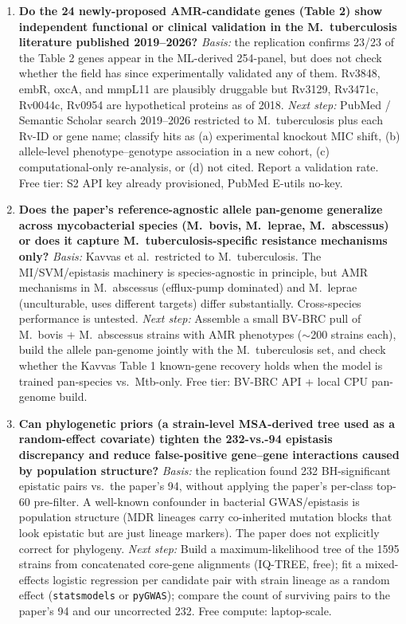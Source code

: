 \begin{enumerate}[leftmargin=1.6em,itemsep=0.6em]
\item \textbf{Do the 24 newly-proposed AMR-candidate genes (Table 2) show independent
functional or clinical validation in the M.\ tuberculosis literature published 2019--2026?}
\emph{Basis:} the replication confirms 23/23 of the Table 2 genes appear in the ML-derived
254-panel, but does not check whether the field has since experimentally validated any of
them. Rv3848, embR, oxcA, and mmpL11 are plausibly druggable but Rv3129, Rv3471c, Rv0044c,
Rv0954 are hypothetical proteins as of 2018.
\emph{Next step:} PubMed / Semantic Scholar search 2019--2026 restricted to M.\ tuberculosis
plus each Rv-ID or gene name; classify hits as (a) experimental knockout MIC shift,
(b) allele-level phenotype--genotype association in a new cohort, (c) computational-only
re-analysis, or (d) not cited. Report a validation rate. Free tier: S2 API key already
provisioned, PubMed E-utils no-key.

\item \textbf{Does the paper's reference-agnostic allele pan-genome generalize across
mycobacterial species (M.\ bovis, M.\ leprae, M.\ abscessus) or does it capture
M.\ tuberculosis-specific resistance mechanisms only?}
\emph{Basis:} Kavvas et al.\ restricted to M.\ tuberculosis. The MI/SVM/epistasis machinery
is species-agnostic in principle, but AMR mechanisms in M.\ abscessus (efflux-pump dominated)
and M.\ leprae (unculturable, uses different targets) differ substantially. Cross-species
performance is untested.
\emph{Next step:} Assemble a small BV-BRC pull of M.\ bovis + M.\ abscessus strains with
AMR phenotypes ($\sim$200 strains each), build the allele pan-genome jointly with the
M.\ tuberculosis set, and check whether the Kavvas Table 1 known-gene recovery holds when
the model is trained pan-species vs.\ Mtb-only. Free tier: BV-BRC API + local CPU pan-genome
build.

\item \textbf{Can phylogenetic priors (a strain-level MSA-derived tree used as a
random-effect covariate) tighten the 232-vs.-94 epistasis discrepancy and reduce
false-positive gene--gene interactions caused by population structure?}
\emph{Basis:} the replication found 232 BH-significant epistatic pairs vs.\ the paper's 94,
without applying the paper's per-class top-60 pre-filter. A well-known confounder in
bacterial GWAS/epistasis is population structure (MDR lineages carry co-inherited mutation
blocks that look epistatic but are just lineage markers). The paper does not explicitly
correct for phylogeny.
\emph{Next step:} Build a maximum-likelihood tree of the 1595 strains from concatenated
core-gene alignments (IQ-TREE, free); fit a mixed-effects logistic regression per candidate
pair with strain lineage as a random effect (\texttt{statsmodels} or \texttt{pyGWAS});
compare the count of surviving pairs to the paper's 94 and our uncorrected 232. Free
compute: laptop-scale.

\end{enumerate}
